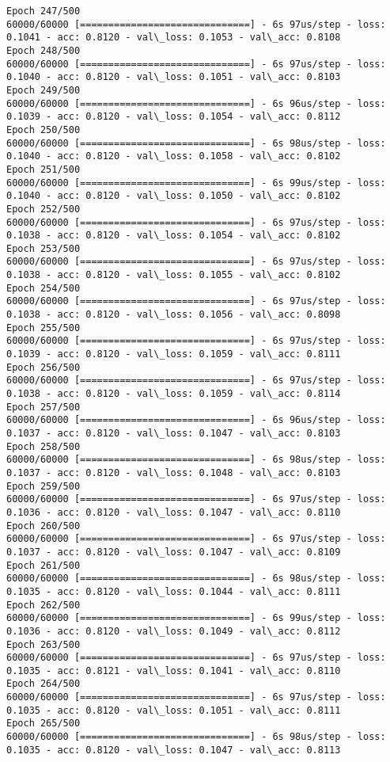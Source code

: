 \documentclass[11pt]{article}
\begin{document}
\begin{Verbatim}[commandchars=\\\{\}]
Epoch 247/500
60000/60000 [==============================] - 6s 97us/step - loss: 0.1041 - acc: 0.8120 - val\_loss: 0.1053 - val\_acc: 0.8108
Epoch 248/500
60000/60000 [==============================] - 6s 97us/step - loss: 0.1040 - acc: 0.8120 - val\_loss: 0.1051 - val\_acc: 0.8103
Epoch 249/500
60000/60000 [==============================] - 6s 96us/step - loss: 0.1039 - acc: 0.8120 - val\_loss: 0.1054 - val\_acc: 0.8112
Epoch 250/500
60000/60000 [==============================] - 6s 98us/step - loss: 0.1040 - acc: 0.8120 - val\_loss: 0.1058 - val\_acc: 0.8102
Epoch 251/500
60000/60000 [==============================] - 6s 99us/step - loss: 0.1040 - acc: 0.8120 - val\_loss: 0.1050 - val\_acc: 0.8102
Epoch 252/500
60000/60000 [==============================] - 6s 97us/step - loss: 0.1038 - acc: 0.8120 - val\_loss: 0.1054 - val\_acc: 0.8102
Epoch 253/500
60000/60000 [==============================] - 6s 97us/step - loss: 0.1038 - acc: 0.8120 - val\_loss: 0.1055 - val\_acc: 0.8102
Epoch 254/500
60000/60000 [==============================] - 6s 97us/step - loss: 0.1038 - acc: 0.8120 - val\_loss: 0.1056 - val\_acc: 0.8098
Epoch 255/500
60000/60000 [==============================] - 6s 97us/step - loss: 0.1039 - acc: 0.8120 - val\_loss: 0.1059 - val\_acc: 0.8111
Epoch 256/500
60000/60000 [==============================] - 6s 97us/step - loss: 0.1038 - acc: 0.8120 - val\_loss: 0.1059 - val\_acc: 0.8114
Epoch 257/500
60000/60000 [==============================] - 6s 96us/step - loss: 0.1037 - acc: 0.8120 - val\_loss: 0.1047 - val\_acc: 0.8103
Epoch 258/500
60000/60000 [==============================] - 6s 98us/step - loss: 0.1037 - acc: 0.8120 - val\_loss: 0.1048 - val\_acc: 0.8103
Epoch 259/500
60000/60000 [==============================] - 6s 97us/step - loss: 0.1036 - acc: 0.8120 - val\_loss: 0.1047 - val\_acc: 0.8110
Epoch 260/500
60000/60000 [==============================] - 6s 97us/step - loss: 0.1037 - acc: 0.8120 - val\_loss: 0.1047 - val\_acc: 0.8109
Epoch 261/500
60000/60000 [==============================] - 6s 98us/step - loss: 0.1035 - acc: 0.8120 - val\_loss: 0.1044 - val\_acc: 0.8111
Epoch 262/500
60000/60000 [==============================] - 6s 99us/step - loss: 0.1036 - acc: 0.8120 - val\_loss: 0.1049 - val\_acc: 0.8112
Epoch 263/500
60000/60000 [==============================] - 6s 97us/step - loss: 0.1035 - acc: 0.8121 - val\_loss: 0.1041 - val\_acc: 0.8110
Epoch 264/500
60000/60000 [==============================] - 6s 97us/step - loss: 0.1035 - acc: 0.8120 - val\_loss: 0.1051 - val\_acc: 0.8111
Epoch 265/500
60000/60000 [==============================] - 6s 98us/step - loss: 0.1035 - acc: 0.8120 - val\_loss: 0.1047 - val\_acc: 0.8113

\end{Verbatim}
\end{document}
